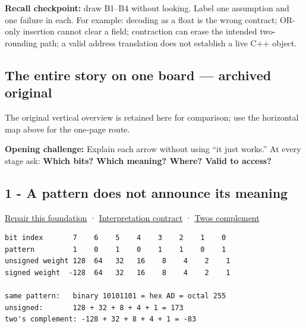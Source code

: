 \textbf{Recall checkpoint:} draw B1--B4 without looking. Label one assumption and one failure in each. For example: decoding  as a float is the wrong contract; OR-only insertion cannot clear a field; contraction can erase the intended two-rounding path; a valid address translation does not establish a live C++ object.

\subsection{The entire story on one board --- archived original}\label{appendix-ef4d27797a92-the-entire-story-on-one-board-archived-original}

\hypertarget{appendix-ef4d27797a92-the-entire-story-on-one-board-archived-original}{}

The original vertical overview is retained here for comparison; use the horizontal map above for the one-page route.


\textbf{Opening challenge:} Explain each arrow without using ``it just works.'' At every stage ask: \textbf{Which bits? Which meaning? Where? Valid to access?}

\subsection{1 - A pattern does not announce its meaning}\label{appendix-ef4d27797a92-a-pattern-does-not-announce-its-meaning}

\hypertarget{appendix-ef4d27797a92-a-pattern-does-not-announce-its-meaning}{}

\hyperref[01-foundations-i-ch001-from-a-signal-to-an-interpretation]{Repair this foundation} · \hyperref[appendix-f414bd4ed05c]{Interpretation contract} · \hyperref[appendix-4fbc03d20829]{Two\textquotesingle s complement}

\begin{verbatim}
bit index       7    6    5    4    3    2    1    0
pattern         1    0    1    0    1    1    0    1
unsigned weight 128  64   32   16    8    4    2    1
signed weight  -128  64   32   16    8    4    2    1

same pattern:   binary 10101101 = hex AD = octal 255
unsigned:       128 + 32 + 8 + 4 + 1 = 173
two's complement: -128 + 32 + 8 + 4 + 1 = -83
\end{verbatim}

